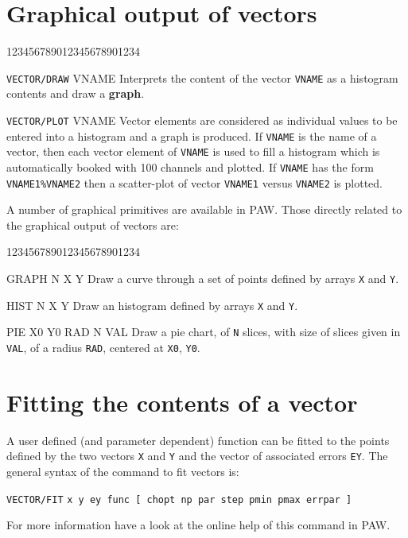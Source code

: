 \section{Graphical output of vectors}

\begin{DLtt}{123456789012345678901234}
\item[\texttt{VECTOR/DRAW} VNAME]
     Interprets the content of the vector \texttt{VNAME}
     as a histogram contents and draw a {\bf graph}.
\item[\texttt{VECTOR/PLOT} VNAME]
     Vector elements are considered as individual values
     to be entered into a histogram and a graph is produced.
     If \texttt{VNAME} is the name of a vector, then each vector element of
     \texttt{VNAME} is used to fill a histogram which is 
     automatically booked with 100 channels and plotted.
     If \texttt{VNAME} has the form \texttt{VNAME1\%VNAME2}
     then a scatter-plot of vector \texttt{VNAME1}
     versus \texttt{VNAME2} is plotted.
\end{DLtt}
 
 
A number of graphical primitives are available in PAW.
Those directly related to the graphical output of vectors are:

\begin{DLtt}{123456789012345678901234}
\item[GRAPH N X Y]
     Draw a curve through a set of points defined by arrays 
     \texttt{X} and \texttt{Y}.
\item[HIST  N X Y]
     Draw an histogram defined by arrays \texttt{X} and \texttt{Y}.
\item[PIE   X0 Y0 RAD N VAL]
     Draw a pie chart, of \texttt{N} slices, 
     with size of slices given in \texttt{VAL},
     of a radius \texttt{RAD}, centered at \texttt{X0}, \texttt{Y0}.
\end{DLtt}

\section{Fitting the contents of a vector}
 
A user defined (and parameter dependent) function
can be fitted to the points defined by the two vectors \texttt{X}
and \texttt{Y} and the vector of associated errors \texttt{EY}.
The general syntax of the command to fit vectors is:

\texttt{VECTOR/FIT} \texttt{x y ey func [ chopt np par step pmin pmax errpar ]}

For more information have a look at the online help of this command in PAW.

